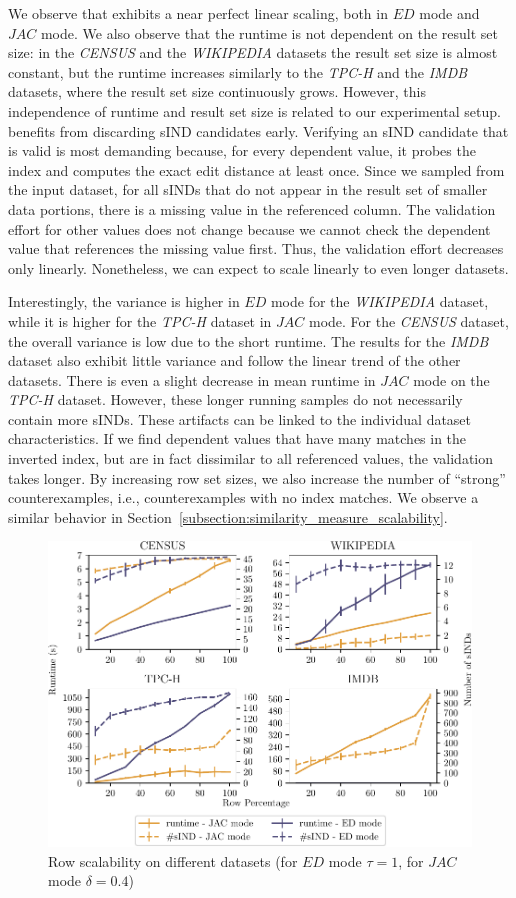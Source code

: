 We observe that \sawfish exhibits a near perfect linear scaling, both in $ED$ mode and $JAC$ mode.
We also observe that the runtime is not dependent on the result set size: in the \emph{CENSUS} and the \emph{WIKIPEDIA} datasets the result set size is almost constant, but the runtime increases similarly to the \emph{TPC-H} and the \emph{IMDB} datasets, where the result set size continuously grows.
However, this independence of runtime and result set size is related to our experimental setup.
\sawfish benefits from discarding sIND candidates early.
Verifying an sIND candidate that is valid is most demanding because, for every dependent value, it probes the index and computes the exact edit distance at least once.
Since we sampled from the input dataset, for all sINDs that do not appear in the result set of smaller data portions, there is a missing value in the referenced column.
The validation effort for other values does not change because we cannot check the dependent value that references the missing value first.
Thus, the validation effort decreases only linearly.
Nonetheless, we can expect \sawfish to scale linearly to even longer datasets.

Interestingly, the variance is higher in $ED$ mode for the \emph{WIKIPEDIA} dataset, while it is higher for the \emph{TPC-H} dataset in $JAC$ mode.
For the \emph{CENSUS} dataset, the overall variance is low due to the short runtime.
The results for the \emph{IMDB} dataset also exhibit little variance and follow the linear trend of the other datasets.
There is even a slight decrease in mean runtime in $JAC$ mode on the \emph{TPC-H} dataset.
However, these longer running samples do not necessarily contain more sINDs.
These artifacts can be linked to the individual dataset characteristics.
If we find dependent values that have many matches in the inverted index, but are in fact dissimilar to all referenced values, the validation takes longer.
By increasing row set sizes, we also increase the number of ``strong'' counterexamples, i.e., counterexamples with no index matches.
We observe a similar behavior in Section~\ref{subsection:similarity_measure_scalability}.


\begin{figure}[ht]
    \centering
    \includegraphics[width=.8\columnwidth]{figures/row_scaling.pdf}
    \caption{Row scalability on different datasets (for $ED$ mode $\tau = 1$, for $JAC$ mode $\delta = 0.4$)}
    \label{fig:eval:row}
\end{figure}

